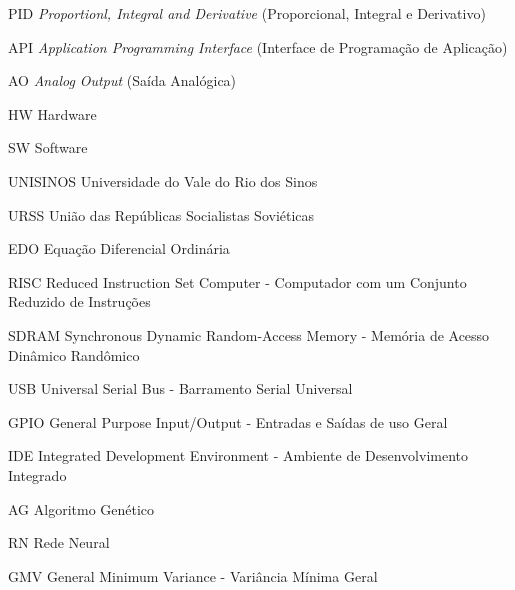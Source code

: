 \listoffigures*
\cleardoublepage
\listoftables*
\cleardoublepage
\begin{siglas}
\item[PID] \textit{Proportionl, Integral and Derivative} (Proporcional, Integral e Derivativo)
\item[API] \textit{Application Programming Interface} (Interface de Programação de Aplicação)
\item[AO] \textit{Analog Output} (Saída Analógica)
\item[HW] Hardware
\item[SW] Software
\item[UNISINOS] Universidade do Vale do Rio dos Sinos
\item[URSS] União das Repúblicas Socialistas Soviéticas
\item[EDO] Equação Diferencial Ordinária
\item[RISC] Reduced Instruction Set Computer - Computador com um Conjunto Reduzido de Instruções
\item[SDRAM] Synchronous Dynamic Random-Access Memory - Memória de Acesso Dinâmico Randômico
\item[USB]  Universal Serial Bus - Barramento Serial Universal
\item[GPIO] General Purpose Input/Output - Entradas e Saídas de uso Geral
\item[IDE] Integrated Development Environment - Ambiente de Desenvolvimento Integrado
\item[AG] Algoritmo Genético
\item[RN] Rede Neural
\item[GMV] General Minimum Variance - Variância Mínima Geral

\end{siglas}
